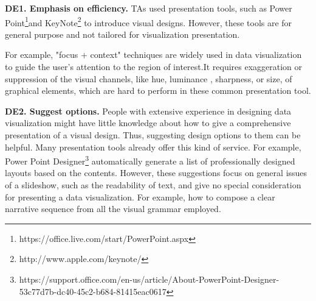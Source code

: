 
\textbf{DE1. Emphasis on  efficiency.}
TAs used presentation tools, such as Power Point\footnote{https://office.live.com/start/PowerPoint.aspx}and KeyNote\footnote{http://www.apple.com/keynote/} to introduce visual designs. However, these tools are for general purpose and not tailored for visualization presentation. 

For example, "focus + context" techniques are widely used in data visualization to guide the user’s attention to the region of interest.\cite{doleisch2003interactive, kosara2002focus+}It requires exaggeration or suppression of the visual channels, like hue, luminance , sharpness, or size, of graphical elements, which are hard to perform in these common presentation tool. 


\textbf{DE2. Suggest options.}
People with extensive experience in designing data visualization might have little knowledge about how to give a comprehensive presentation of a visual design. Thus, suggesting design options to them can be helpful. Many presentation tools already offer this kind of service. For example, Power Point Designer\footnote{https://support.office.com/en-us/article/About-PowerPoint-Designer-53c77d7b-dc40-45c2-b684-81415eac0617} automatically generate a list of professionally designed layouts based on the contents. However, these suggestions focus on general issues of a slideshow, such as the readability of text, and give no special consideration for presenting a data visualization.
For example, how to compose a clear narrative sequence from all the visual grammar employed.


